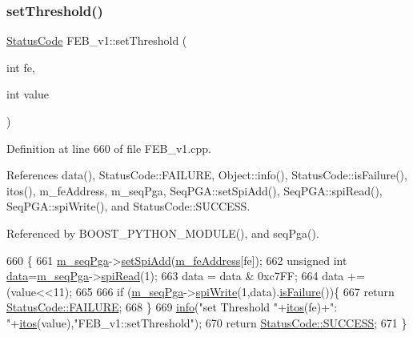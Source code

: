 \subsubsection{\texorpdfstring{set\+Threshold()}{setThreshold()}}
{\footnotesize\ttfamily \hyperlink{classStatusCode}{Status\+Code} F\+E\+B\+\_\+v1\+::set\+Threshold (\begin{DoxyParamCaption}\item[{int}]{fe,  }\item[{int}]{value }\end{DoxyParamCaption})}



Definition at line 660 of file F\+E\+B\+\_\+v1.\+cpp.



References data(), Status\+Code\+::\+F\+A\+I\+L\+U\+RE, Object\+::info(), Status\+Code\+::is\+Failure(), itos(), m\+\_\+fe\+Address, m\+\_\+seq\+Pga, Seq\+P\+G\+A\+::set\+Spi\+Add(), Seq\+P\+G\+A\+::spi\+Read(), Seq\+P\+G\+A\+::spi\+Write(), and Status\+Code\+::\+S\+U\+C\+C\+E\+SS.



Referenced by B\+O\+O\+S\+T\+\_\+\+P\+Y\+T\+H\+O\+N\+\_\+\+M\+O\+D\+U\+L\+E(), and seq\+Pga().


\begin{DoxyCode}
660                                                   \{
661   \hyperlink{classFEB__v1_a6c7804ac86796f233a8393043adf2e77}{m\_seqPga}->\hyperlink{classSeqPGA_ac998ce3a6d9b5f2e88cc8393f8c1df53}{setSpiAdd}(\hyperlink{classFEB__v1_a4e1945c2d5b434125f375e9d0fc6d99f}{m\_feAddress}[fe]);
662   \textcolor{keywordtype}{unsigned} \textcolor{keywordtype}{int} \hyperlink{classFEB__v1_a6bca4320bd3bbbc32efc81097f33421a}{data}=\hyperlink{classFEB__v1_a6c7804ac86796f233a8393043adf2e77}{m\_seqPga}->\hyperlink{classSeqPGA_ab3d0e5e5d4014bc7a92588a76b8713d4}{spiRead}(1);
663   data = data & 0xc7FF;
664   data += (value<<11);
665   
666   \textcolor{keywordflow}{if} (\hyperlink{classFEB__v1_a6c7804ac86796f233a8393043adf2e77}{m\_seqPga}->\hyperlink{classSeqPGA_ad4421841ce4ce8b88ad13f63216f0743}{spiWrite}(1,data).\hyperlink{classStatusCode_a5dd22dc6eb2c52fc4cabc58f6dea2eb7}{isFailure}())\{
667     \textcolor{keywordflow}{return} \hyperlink{classStatusCode_a6f565cbeadc76d14c72f047e5e85eb4ba3da73d4c469762eb9d3c960368252b26}{StatusCode::FAILURE};
668   \}
669   \hyperlink{classObject_a644fd329ea4cb85f54fa6846484b84a8}{info}(\textcolor{stringliteral}{"set Threshold "}+\hyperlink{Tools_8h_af330027dbdafb9a30768b3613c553e60}{itos}(fe)+\textcolor{stringliteral}{": "}+\hyperlink{Tools_8h_af330027dbdafb9a30768b3613c553e60}{itos}(value),\textcolor{stringliteral}{"FEB\_v1::setThreshold"});
670   \textcolor{keywordflow}{return} \hyperlink{classStatusCode_a6f565cbeadc76d14c72f047e5e85eb4badd0da38d3ba0d922efd1f4619bc37ad8}{StatusCode::SUCCESS};
671 \}
\end{DoxyCode}
\mbox{\label{classObject_a89557dbbad5bcaa02652f5d7fa35d20f}} 
